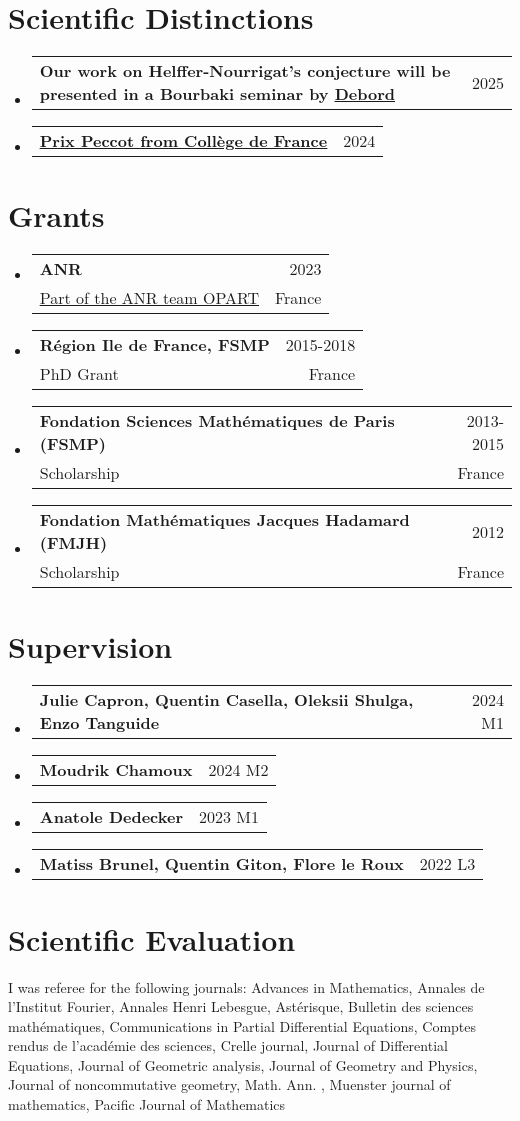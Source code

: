 \documentclass[A4,11pt]{article}
\makeatletter
\newcommand{\CVSubheading}[4]{
  \vspace{-2pt}\item
    \begin{tabular*}{0.97\textwidth}[t]{l@{\extracolsep{\fill}}r}
      \textbf{#1} & #2 \\
      \small#3 & \small #4 \\
    \end{tabular*}\vspace{-7pt}
}
\newcommand{\CVSubheadingshort}[2]{
  \vspace{-2pt}\item
    \begin{tabular*}{0.97\textwidth}[t]{l@{\extracolsep{\fill}}r}
      \textbf{#1} & #2 \\
    \end{tabular*}\vspace{-7pt}
}
\newcommand{\CVSubHeadingListStart}{\begin{itemize}[leftmargin=0.5cm, label={}]}
\newcommand{\CVSubHeadingListEnd}{\end{itemize}}
\makeatother
\begin{document}
  \section{Scientific Distinctions}
\CVSubHeadingListStart
\CVSubheadingshort{Our work on Helffer-Nourrigat's conjecture will be presented in a Bourbaki seminar by \href{https://webusers.imj-prg.fr/~claire.debord/}{\underline{Debord}}}{2025}{}{}
\CVSubheadingshort{\href{https://www.college-de-france.fr/fr/personne/omar-mohsen}{\underline{Prix Peccot from Collège de France}}}{2024}{}{}
\CVSubHeadingListEnd
 
\section{Grants}
  \CVSubHeadingListStart
\CVSubheading
{ANR}{2023}
{\href{https://anr.fr/Project-ANR-23-CE40-0016}{\underline{Part of the ANR team OPART}}}{France}
    \CVSubheading
      {Région Ile de France, FSMP}{2015-2018}
      {PhD Grant}{France}
      \CVSubheading
      {Fondation Sciences Mathématiques de Paris (FSMP)}{2013-2015}
      {Scholarship}{France}
       \CVSubheading
      {Fondation Mathématiques Jacques Hadamard (FMJH)}{2012}
      {Scholarship}{France}
  \CVSubHeadingListEnd
  \section{Supervision}
  \CVSubHeadingListStart
\CVSubheadingshort
{Julie Capron, Quentin Casella, Oleksii Shulga, Enzo Tanguide}{2024 M1}
\CVSubheadingshort
{Moudrik Chamoux}{2024 M2}
    \CVSubheadingshort
      {Anatole Dedecker}{2023 M1}
      \CVSubheadingshort
      {Matiss Brunel, Quentin Giton, Flore le Roux}{2022 L3}

  \CVSubHeadingListEnd
  \section{Scientific Evaluation}
  I was referee for the following journals: Advances in Mathematics, Annales de l'Institut Fourier, Annales Henri Lebesgue, Astérisque, Bulletin des sciences mathématiques, Communications in Partial Differential Equations, Comptes rendus de l'académie des sciences, Crelle journal, Journal of Differential Equations, Journal of Geometric analysis, Journal of Geometry and Physics, Journal of noncommutative geometry, Math. Ann.  , Muenster journal of mathematics, Pacific Journal of Mathematics
\end{document}
